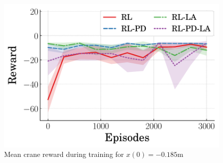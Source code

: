 %
\begin{figure}[tb]
    \centering
    \includegraphics[width=0.65\columnwidth]{figures/figures_RL_model_based_control/dpcrane_neg_mean_reward_v_episode.pdf}
    \vspace{-2ex}
    \caption{Mean crane reward during training for $x(0)=-0.185\si{\meter}$}
    \label{fig:dpcrane_neg_mean_reward_baseline}
\end{figure}
%
